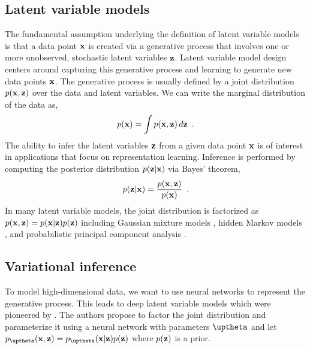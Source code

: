 \subsection{Latent variable models}
The fundamental assumption underlying the definition of latent variable models is that a data point ${\mathbf{x}}$ is created via a generative process that involves one or more unobserved, stochastic latent variables  ${\mathbf{z}}$. 
Latent variable model design centers around capturing this generative process and learning to generate new data points ${\mathbf{x}}$. The generative process is usually defined by a joint distribution $p({\mathbf{x}}, {\mathbf{z}})$ over the data and latent variables. 
We can write the marginal distribution of the data as,
%
\begin{equation} \label{eq:latent-variable-model-marginal-distribution}
    p(\xb) = \int p(\xb,\zb) \, d\zb \enspace .
\end{equation}
%
The ability to infer the latent variables ${\mathbf{z}}$ from a given data point ${\mathbf{x}}$ is of interest in applications that focus on representation learning. Inference is performed by computing the posterior distribution $p({\mathbf{z}}|{\mathbf{x}})$ via Bayes' theorem,
%
\begin{equation} \label{eq:latent-variable-model-posterior-distribution}
    p(\zb|\xb) = \frac{p(\xb,\zb)}{p(\xb)} \enspace .
\end{equation}
%
In many latent variable models, the joint distribution is factorized as $p({\mathbf{x}},{\mathbf{z}}) = p({\mathbf{x}}|{\mathbf{z}})p({\mathbf{z}})$ including Gaussian mixture models \parencite{dempster_maximum_1977}, hidden Markov models \parencite{rabiner_tutorial_1989}, and probabilistic principal component analysis \parencite{tipping_probabilistic_1999}. 



\subsection{Variational inference} \label{sec:variational-autoencoders}
To model high-dimensional data, we want to use neural networks to represent the generative process. 
This leads to deep latent variable models which were pioneered by \textcite{kingma_autoencoding_2014,rezende_stochastic_2014}. The authors propose to factor the joint distribution and parameterize it using a neural network with parameters $\thetab$ and let $p_\thetab(\xb,\zb) = p_\thetab(\xb|\zb)p(\zb)$ where $p({\mathbf{z}})$ is a prior. 

